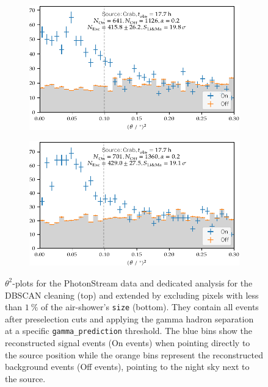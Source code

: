 \begin{figure}
  \begin{subfigure}{\textwidth}
    \centering
    \includegraphics[width=\textwidth]{Plots/results/DBSCAN/theta2_plot.pdf}
  \end{subfigure}
  \begin{subfigure}{\textwidth}
    \centering
    \includegraphics[width=\textwidth]{Plots/results/DBSCAN_perc/theta2_plot.pdf}
  \end{subfigure}
  \caption{$\theta^2$-plots for the PhotonStream data and dedicated analysis for the DBSCAN cleaning (top) and extended by excluding pixels with less than $\SI{1}{\percent}$ of the air-shower's \texttt{size} (bottom). They contain all events after preselection cuts and applying the gamma hadron separation at a specific \texttt{gamma\_prediction} threshold. The blue bins show the reconstructed signal events (On events) when pointing directly to the source position while the orange bins represent the reconstructed background events (Off events), pointing to the night sky next to the source.}
  \label{fig:theta2}
\end{figure}
%

